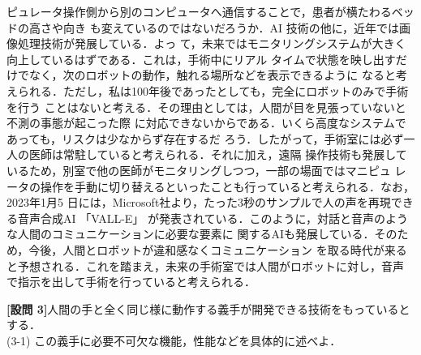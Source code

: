 \documentclass{jsarticle}
\begin{document}
\hspace*{5.7zw}ピュレータ操作側から別のコンピュータへ通信することで，患者が横たわるベッドの高さや向き
\hspace*{5.7zw}も変えているのではないだろうか．AI 技術の他に，近年では画像処理技術が発展している．よっ
\hspace*{5.7zw}て，未来ではモニタリングシステムが大きく向上しているはずである．これは，手術中にリアル
\hspace*{5.7zw}タイムで状態を映し出すだけでなく，次のロボットの動作，触れる場所などを表示できるように
\hspace*{5.7zw}なると考えられる．ただし，私は100年後であったとしても，完全にロボットのみで手術を行う
\hspace*{5.7zw}ことはないと考える．その理由としては，人間が目を見張っていないと不測の事態が起こった際
\hspace*{5.7zw}に対応できないからである．いくら高度なシステムであっても，リスクは少なからず存在するだ
\hspace*{5.7zw}ろう．したがって，手術室には必ず一人の医師は常駐していると考えられる．それに加え，遠隔
\hspace*{5.7zw}操作技術も発展しているため，別室で他の医師がモニタリングしつつ，一部の場面ではマニピュ
\hspace*{5.7zw}レータの操作を手動に切り替えるといったことも行っていると考えられる．なお，2023年1月5
\hspace*{5.7zw}日には，Microsoft社より，たった3秒のサンプルで人の声を再現できる音声合成AI 「VALL-E」
\hspace*{5.7zw}が発表されている．このように，対話と音声のような人間のコミュニケーションに必要な要素に
\hspace*{5.7zw}関するAIも発展している．そのため，今後，人間とロボットが違和感なくコミュニケーション
\hspace*{5.7zw}を取る時代が来ると予想される．これを踏まえ，未来の手術室では人間がロボットに対し，音声
\hspace*{5.7zw}で指示を出して手術を行っていると考えられる．



\newpage

\vspace*{-10zh}

\textbf{{[設問 3]}}\hspace*{1zw}人間の手と全く同じ様に動作する義手が開発できる技術をもっているとする．\\
\hspace*{5.7zw}(3-1) この義手に必要不可欠な機能，性能などを具体的に述べよ．
\end{document}
